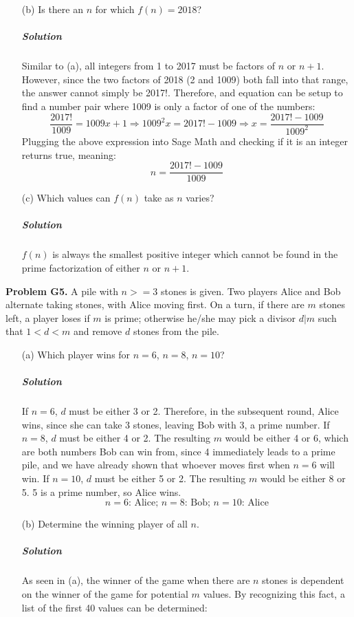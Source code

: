 \documentclass[a4paper]{amsart}
\begin{document}
\begin{flushleft}
\begin{enumerate}
			\item[(b)] Is there an $n$ for which $f(n)=2018$?
			
			\subparagraph{\textbf{Solution}} Similar to (a), all integers from 1 to 2017 must be factors of $n$ or $n+1$. However, since the two factors of 2018 (2 and 1009) both fall into that range, the answer cannot simply be 2017!. Therefore, and equation can be setup to find a number pair where 1009 is only a factor of one of the numbers:
			\[ \frac{2017!}{1009}=1009x+1\Rightarrow 1009^2x=2017!-1009\Rightarrow x=\frac{2017!-1009}{1009^2} \]
			Plugging the above expression into Sage Math and checking if it is an integer returns true, meaning:
			\[ n=\frac{2017!-1009}{1009} \]
			
			\item[(c)] Which values can $f(n)$ take as $n$ varies?
			
			\subparagraph{\textbf{Solution}} $f(n)$ is always the smallest positive integer which cannot be found in the prime factorization of either $n$ or $n+1$.
		\end{enumerate}
	
		\textbf{Problem G5.} A pile with $n>=3$ stones is given. Two players Alice and Bob alternate taking stones, with Alice moving first. On a turn, if there are $m$ stones left, a player loses if $m$ is prime; otherwise he/she may pick a divisor $d | m$ such that $1<d<m$ and remove $d$ stones from the pile.
		
		\begin{enumerate}
			\item[(a)] Which player wins for $n=6$, $n=8$, $n=10$?
			
			\subparagraph{\textbf{Solution}} If $n=6$, $d$ must be either 3 or 2. Therefore, in the subsequent round, Alice wins, since she can take 3 stones, leaving Bob with 3, a prime number. If $n=8$, $d$ must be either 4 or 2. The resulting $m$ would be either 4 or 6, which are both numbers Bob can win from, since 4 immediately leads to a prime pile, and we have already shown that whoever moves first when $n=6$ will win. If $n=10$, $d$ must be either 5 or 2. The resulting $m$ would be either 8 or 5. 5 is a prime number, so Alice wins.
			\[ \text{$n=6$: Alice; $n=8$: Bob; $n=10$: Alice} \]
			
			\item[(b)] Determine the winning player of all $n$.
			
			\subparagraph{\textbf{Solution}} As seen in (a), the winner of the game when there are $n$ stones is dependent on the winner of the game for potential $m$ values. By recognizing this fact, a list of the first 40 values can be determined:
			

\end{enumerate}
\end{flushleft}
\end{document}
